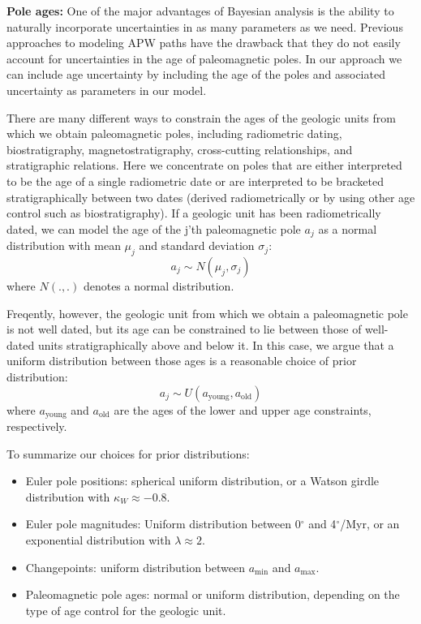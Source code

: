 \documentclass[preprint,12pt,authoryear]{elsarticle}
\begin{document}
\textbf{Pole ages:}
One of the major advantages of Bayesian analysis is the ability to naturally incorporate
uncertainties in as many parameters as we need. Previous approaches to
modeling APW paths have the drawback that they do not easily account for uncertainties in
the age of paleomagnetic poles. In our approach we can include age uncertainty
by including the age of the poles and associated uncertainty as parameters in our model.

There are many different ways to constrain the ages of the geologic units from
which we obtain paleomagnetic poles, including radiometric dating, biostratigraphy,
magnetostratigraphy, cross-cutting relationships, and stratigraphic relations.
Here we concentrate on poles that are either interpreted to be the age of a single radiometric
date or are interpreted to be bracketed stratigraphically between two dates
(derived radiometrically or by using other age control such as biostratigraphy).
If a geologic unit has been radiometrically dated, we can model the age of
the j'th paleomagnetic pole $a_j$ as a normal distribution with mean $\mu_j$ and standard deviation $\sigma_j$:
\begin{equation}
a_j \sim N(\mu_j, \sigma_j)
\end{equation}
where $N(.,.)$ denotes a normal distribution.

Freqently, however, the geologic unit from which we obtain a paleomagnetic pole
is not well dated, but its age can be constrained to lie between those
of well-dated units stratigraphically above and below it. In this case,
we argue that a uniform distribution between those ages is a reasonable choice
of prior distribution:
\begin{equation}
a_j \sim U(a_\mathrm{young}, a_\mathrm{old})
\end{equation}
where $a_\mathrm{young}$ and $a_\mathrm{old}$ are the ages of the lower and upper
age constraints, respectively.

To summarize our choices for prior distributions:
\begin{itemize}
\item Euler pole positions: spherical uniform distribution, or a Watson girdle distribution with $\kappa_W \approx -0.8$.
\item Euler pole magnitudes: Uniform distribution between 0$^\circ$ and 4$^\circ$/Myr, or an exponential distribution with $\lambda \approx 2$.
\item Changepoints: uniform distribution between $a_\mathrm{min}$ and $a_\mathrm{max}$.
\item Paleomagnetic pole ages: normal or uniform distribution, depending on the type of age control for the geologic unit.
\end{itemize}
\end{document}
